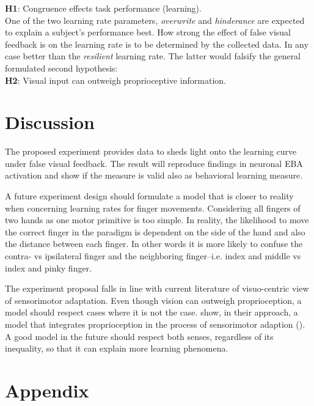 \documentclass[man]{apa7}
\begin{document}
\textbf{H1}: Congruence effects task performance (learning).\\

One of the two learning rate parameters, \textit{overwrite} and \textit{hinderance} are expected to explain a subject's performance best. How strong the effect of false visual feedback is on the learning rate is to be determined by the collected data. In any case better than the \textit{resilient} learning rate. The latter would falsify the general formulated second hypothesis: \\

\textbf{H2}: Visual input can outweigh proprioceptive information.

\section{Discussion}

The proposed experiment provides data to sheds light onto the learning curve under false visual feedback. The result will reproduce findings in neuronal EBA activation and show if the measure is valid also as behavioral learning measure.

A future experiment design should formulate a model that is closer to reality when concerning learning rates for finger movements. Considering all fingers of two hands as one motor primitive is too simple. In reality, the likelihood to move the correct finger in the paradigm is dependent on the side of the hand and also the distance between each finger. In other words it is more likely to confuse the contra- vs ipsilateral finger and the neighboring finger–i.e. index and middle vs index and pinky finger.

The experiment proposal falls in line with current literature of visuo-centric view of sensorimotor adaptation. Even though vision can outweigh proprioception, a model should respect cases where it is not the case. \citeauthor{Tsay2022} show, in their approach, a model that integrates proprioception in the process of sensorimotor adaption (\citeyear{Tsay2022}). A good model in the future should respect both senses, regardless of its inequality, so that it can explain more learning phenomena.

\printbibliography
\newpage
\section{Appendix}
\end{document}
